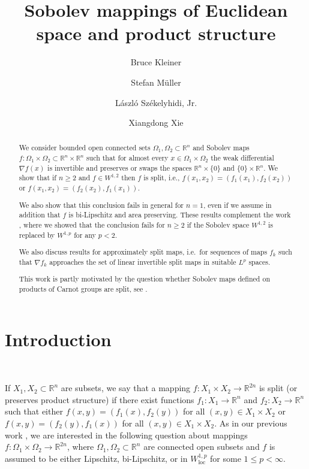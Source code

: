 \documentclass[titlepage]{amsart}
\title[Sobolev mappings and product structure]
{ Sobolev mappings of Euclidean space and product structure}
\author[B. Kleiner]{Bruce Kleiner}
\author[S. M\"uller]{Stefan M\"uller}
\author[L. Sz{\'{e}}kelyhidi]{ L\'{a}szl\'{o} Sz{\'{e}}kelyhidi, Jr.}
\author[X. Xie]{Xiangdong Xie}
\numberwithin{equation}{section}
\theoremstyle{plain}
\theoremstyle{definition}
\theoremstyle{remark}
\newcommand{\loc}{\operatorname{loc}}
\newcommand{\Om}{\Omega}
\newcommand{\R}{\mathbb{R}}
\newcommand{\ra}{\rightarrow}
\newcommand{\g}{\nabla }
\begin{document}
\begin{abstract}  
 We consider bounded open connected sets $\Omega_1, \Omega_2 \subset \R^n$ and 
 Sobolev maps $f: \Omega_1 \times \Omega_2 \subset \R^n \times \R^n$ such that for almost every $x \in \Omega_1 \times \Omega_2$
the weak differential $\g f(x)$ is invertible  and  preserves or swaps the spaces $\R^n \times \{0\}$ and $\{0\} \times \R^n$.  
We show that if 
 $n \ge 2$ and $f \in W^{1,2}$  
then $f$ is split, i.e., $f(x_1, x_2) = (f_1(x_1), f_2(x_2))$
or $f(x_1, x_2) = (f_2(x_2), f_1(x_1))$. 

We also show that this conclusion fails in general for $n=1$, even if we assume in addition that $f$ is bi-Lipschitz
and area preserving. 
These results complement the work \cite{kmsx_counterexample}, where we showed that the conclusion fails for $n \ge 2$ if the Sobolev space $W^{1,2}$ is replaced by $W^{1,p}$
for any $p < 2$. 

We also discuss results for approximately split maps, i.e.~for  sequences of  maps $f_k$
such that $\g f_k$ approaches the set of linear invertible split maps in suitable $L^p$ spaces.

This work is partly motivated by the question whether Sobolev maps defined on products of Carnot groups are split, see \cite{KMX1new}.
\end{abstract}


\maketitle

\setcounter{tocdepth}{2}
\tableofcontents





\section{Introduction}~


If $X_1,X_2\subset \R^n$ are subsets, we say that a mapping  $f:X_1\times X_2\ra \R^{2n}$ is split (or preserves product structure) if there exist functions $f_1 : X_1 \to  \R^n$ and $f_2 : X_2 \to \R^n$
  such that either $f(x,y) = (f_1(x),f_2(y))$ for all $(x,y) \in X_1\times X_2$
  or $ f(x,y)=(f_2(y), f_1(x)) $ for all   $(x,y) \in X_1\times X_2$. As in our previous work  \cite{kmsx_counterexample}, we are interested in the following question about mappings $f:\Om_1\times\Om_2\ra \R^{2n}$, where $\Om_1,\Om_2\subset \R^n$ are connected open subsets and $f$ is assumed to be either Lipschitz, bi-Lipschitz, or in $W^{1,p}_{\loc}$ for some $1\leq p<\infty$.
\end{document}
